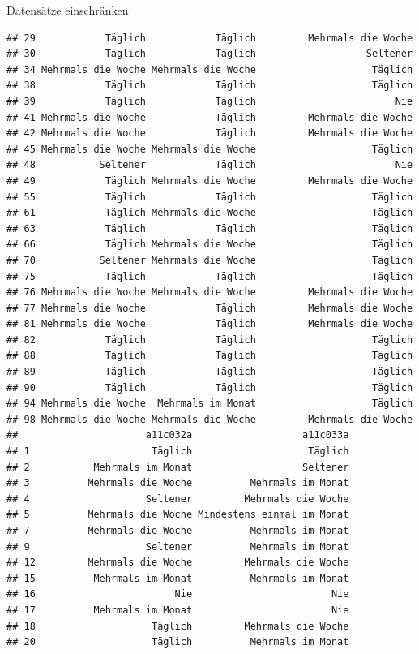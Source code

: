 \documentclass[ignorenonframetext,]{beamer}
\begin{document}
\begin{frame}[fragile]{Datensätze einschränken}
\begin{verbatim}
## 29            Täglich            Täglich         Mehrmals die Woche
## 30            Täglich            Täglich                   Seltener
## 34 Mehrmals die Woche Mehrmals die Woche                    Täglich
## 38            Täglich            Täglich                    Täglich
## 39            Täglich            Täglich                        Nie
## 41 Mehrmals die Woche            Täglich         Mehrmals die Woche
## 42 Mehrmals die Woche            Täglich         Mehrmals die Woche
## 45 Mehrmals die Woche Mehrmals die Woche                    Täglich
## 48           Seltener            Täglich                        Nie
## 49            Täglich Mehrmals die Woche         Mehrmals die Woche
## 55            Täglich            Täglich                    Täglich
## 61            Täglich Mehrmals die Woche                    Täglich
## 63            Täglich            Täglich                    Täglich
## 66            Täglich Mehrmals die Woche                    Täglich
## 70           Seltener Mehrmals die Woche                    Täglich
## 75            Täglich            Täglich                    Täglich
## 76 Mehrmals die Woche Mehrmals die Woche         Mehrmals die Woche
## 77 Mehrmals die Woche            Täglich         Mehrmals die Woche
## 81 Mehrmals die Woche            Täglich         Mehrmals die Woche
## 82            Täglich            Täglich                    Täglich
## 88            Täglich            Täglich                    Täglich
## 89            Täglich            Täglich                    Täglich
## 90            Täglich            Täglich                    Täglich
## 94 Mehrmals die Woche  Mehrmals im Monat                    Täglich
## 98 Mehrmals die Woche Mehrmals die Woche         Mehrmals die Woche
##                      a11c032a                   a11c033a
## 1                     Täglich                    Täglich
## 2           Mehrmals im Monat                   Seltener
## 3          Mehrmals die Woche          Mehrmals im Monat
## 4                    Seltener         Mehrmals die Woche
## 5          Mehrmals die Woche Mindestens einmal im Monat
## 7          Mehrmals die Woche          Mehrmals im Monat
## 9                    Seltener          Mehrmals im Monat
## 12         Mehrmals die Woche         Mehrmals die Woche
## 15          Mehrmals im Monat          Mehrmals im Monat
## 16                        Nie                        Nie
## 17          Mehrmals im Monat                        Nie
## 18                    Täglich         Mehrmals die Woche
## 20                    Täglich          Mehrmals im Monat

\end{verbatim}
\end{frame}
\end{document}

